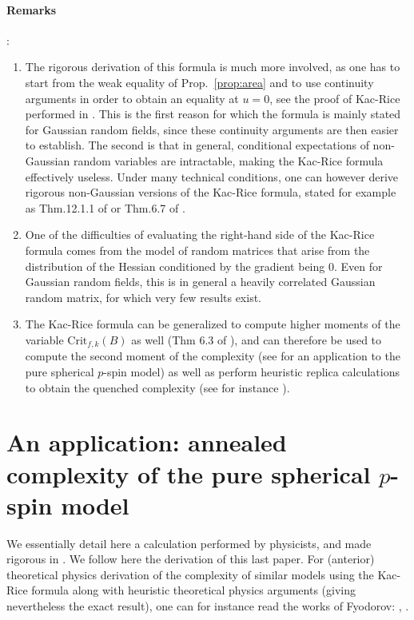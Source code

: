 \documentclass[amsmath,amssymb,nofootinbib,prd]{article}
\begin{document}
	\paragraph{Remarks}:
	\begin{enumerate}
	\item The rigorous derivation of this formula is much more involved, as one has to start from the weak equality of Prop.~\ref{prop:area} and to use continuity arguments in order to obtain an equality at $u = 0$, see the proof of Kac-Rice performed in \cite{azais2009level}. This is the first reason for which the formula is mainly stated for Gaussian random fields, since these continuity arguments are then easier to establish. The second is that in general, conditional expectations of non-Gaussian random variables are intractable, making the Kac-Rice formula effectively useless. Under many technical conditions, one can however derive rigorous non-Gaussian versions of the Kac-Rice formula, stated for example as Thm.12.1.1 of \cite{adler2009random} or Thm.6.7 of \cite{azais2009level}. 
	\item One of the difficulties of evaluating the right-hand side of the Kac-Rice formula comes from the model of random matrices that arise from the distribution of the Hessian conditioned by the gradient being $0$. Even for Gaussian random fields, this is in general a heavily correlated Gaussian random matrix, for which very few results exist. 
	\item The Kac-Rice formula can be generalized to compute higher moments of the variable $\mathrm{Crit}_{f,k}(B)$ as well (Thm 6.3 of \cite{azais2009level}), and can therefore be used to compute the second moment of the complexity (see \cite{subag2017complexity} for an application to the pure spherical $p$-spin model) as well as perform heuristic replica calculations to obtain the quenched complexity (see for instance \cite{ros2019complex}). 
	\end{enumerate}
	
	\section{An application: annealed complexity of the pure spherical $p$-spin model}
	
	We essentially detail here a calculation performed by physicists, and made rigorous in \cite{auffinger2013random}. We follow here the derivation of this last paper. For (anterior) theoretical physics derivation of the complexity of similar models using the Kac-Rice formula along with heuristic theoretical physics arguments (giving nevertheless the exact result), one can for instance read the works of Fyodorov: \cite{fyodorov2004complexity}, \cite{fyodorov2007replica}. 
	
\end{document}

